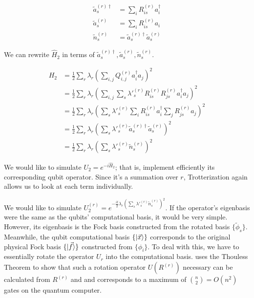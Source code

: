 \begin{equation}
    \begin{split}
        \tilde{a}^{(r)\dag}_s &= \sum_iR^{(r)}_{is}a^\dag_i \\
        \tilde{a}^{(r)}_s &= \sum_iR^{(r)}_{is}a_i \\
        \tilde{n}^{(r)}_s &= \tilde{a}^{(r)\dag}_s\tilde{a}^{(r)}_s
    \end{split}
\end{equation}

We can rewrite $\hat{H}_2$ in terms of $\tilde{a}^{(r)\dag}_s, \tilde{a}^{(r)}_s, \tilde{n}^{(r)}_s$.

\begin{equation}
    \begin{split}
        H_2 &= \frac{1}{2}\sum_r\lambda_r\left(\sum_{i,j} Q^{(r)}_{i, j}a^\dag_ia_j\right)^2 \\
        &= \frac{1}{2}\sum_r\lambda_r\left(\sum_{i,j} \sum_s \lambda'^{(r)}_s R^{(r)}_{is}R^{(r)}_{js}a^\dag_ia_j\right)^2 \\
        &= \frac{1}{2}\sum_r\lambda_r\left(\sum_s \lambda'^{(r)}_s \sum_i R^{(r)}_{is}a^\dag_i\sum_jR^{(r)}_{js}a_j\right)^2 \\
        &= \frac{1}{2}\sum_r\lambda_r\left(\sum_s \lambda'^{(r)}_s \tilde{a}^{(r)\dag}_s\tilde{a}^{(r)}_s\right)^2 \\
        &= \frac{1}{2}\sum_r\lambda_r\left(\sum_s \lambda'^{(r)}_s \tilde{n}^{(r)}_s\right)^2
    \end{split}
\end{equation}

We would like to simulate $U_2 = e^{-i\hat{H}_2}$; that is, implement efficiently its corresponding qubit operator. Since it's a summation over $r$, Trotterization again allows us to look at each term individually.

We would like to simulate $U_2^{(r)} = e^{-\frac{it}{2}\lambda_r\left(\sum_s \lambda'^{(r)}_s \tilde{n}^{(r)}_s\right)^2}$. If the operator's eigenbasis were the same as the qubits' computational basis, it would be very simple. However, its eigenbasis is the Fock basis constructed from the rotated basis $\{\tilde{\phi}_s\}$. Meanwhile, the qubit computational basis $\{\ket{\vec{x}}\}$ corresponds to the original physical Fock basis $\{\ket{\vec{f}}\}$ constructed from $\{\phi_i\}$. To deal with this, we have to essentially rotate the operator $U_r$ into the computational basis. \cite{FSN} uses the Thouless Theorem to show that such a rotation operator $U(R^{(r)})$ necessary can be calculated from $R^{(r)}$ and and corresponds to a maximum of ${n \choose 2} = O(n^2)$ gates on the quantum computer. 

